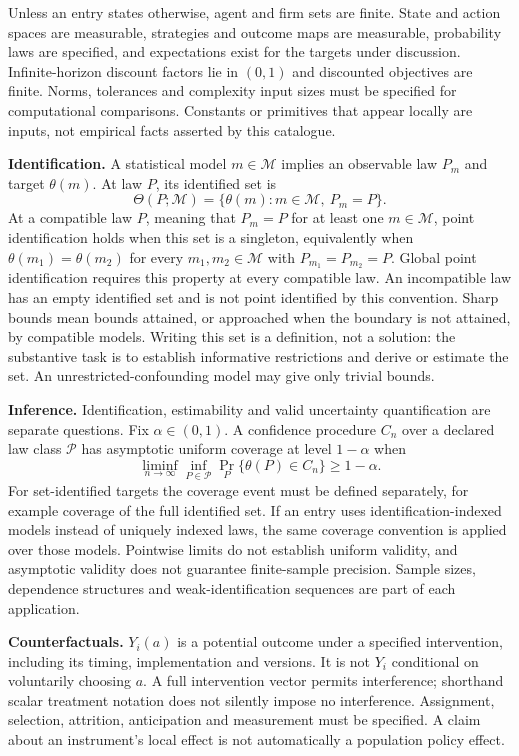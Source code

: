\documentclass[11pt,a4paper]{article}
\begin{document}
Unless an entry states otherwise, agent and firm sets are finite. State and action spaces are measurable, strategies and outcome maps are measurable, probability laws are specified, and expectations exist for the targets under discussion. Infinite-horizon discount factors lie in $(0,1)$ and discounted objectives are finite. Norms, tolerances and complexity input sizes must be specified for computational comparisons. Constants or primitives that appear locally are inputs, not empirical facts asserted by this catalogue.

\textbf{Identification.} A statistical model $m\in\mathcal M$ implies an observable law $P_m$ and target $\theta(m)$. At law $P$, its identified set is
\[
\Theta(P;\mathcal M)=\{\theta(m):m\in\mathcal M,\ P_m=P\}.
\]
At a compatible law $P$, meaning that $P_m=P$ for at least one $m\in\mathcal M$, point identification holds when this set is a singleton, equivalently when $\theta(m_1)=\theta(m_2)$ for every $m_1,m_2\in\mathcal M$ with $P_{m_1}=P_{m_2}=P$. Global point identification requires this property at every compatible law. An incompatible law has an empty identified set and is not point identified by this convention. Sharp bounds mean bounds attained, or approached when the boundary is not attained, by compatible models. Writing this set is a definition, not a solution: the substantive task is to establish informative restrictions and derive or estimate the set. An unrestricted-confounding model may give only trivial bounds.

\textbf{Inference.} Identification, estimability and valid uncertainty quantification are separate questions. Fix $\alpha\in(0,1)$. A confidence procedure $C_n$ over a declared law class $\mathcal P$ has asymptotic uniform coverage at level $1-\alpha$ when
\[
\liminf_{n\to\infty}\inf_{P\in\mathcal P}\Pr_P\{\theta(P)\in C_n\}\geq1-\alpha.
\]
For set-identified targets the coverage event must be defined separately, for example coverage of the full identified set. If an entry uses identification-indexed models instead of uniquely indexed laws, the same coverage convention is applied over those models. Pointwise limits do not establish uniform validity, and asymptotic validity does not guarantee finite-sample precision. Sample sizes, dependence structures and weak-identification sequences are part of each application.

\textbf{Counterfactuals.} $Y_i(a)$ is a potential outcome under a specified intervention, including its timing, implementation and versions. It is not $Y_i$ conditional on voluntarily choosing $a$. A full intervention vector permits interference; shorthand scalar treatment notation does not silently impose no interference. Assignment, selection, attrition, anticipation and measurement must be specified. A claim about an instrument's local effect is not automatically a population policy effect.
\end{document}
